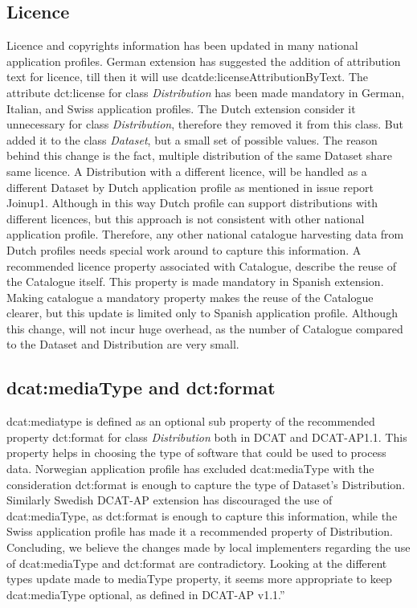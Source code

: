 \documentclass[<options>]{elsarticle}
\begin{document}
\subsection{Licence}
Licence and copyrights information has been updated in many national application profiles. German extension has suggested the addition of attribution text for licence, till then it will use dcatde:licenseAttributionByText. The attribute dct:license for class \textit{Distribution} has been made mandatory in German, Italian, and Swiss application profiles. The Dutch extension consider it unnecessary for class \textit{Distribution}, therefore they removed it from this class. But added it to the class \textit{Dataset}, but a small set of possible values. The reason behind this change is the fact, multiple distribution of the same Dataset share same licence. A Distribution with a different licence, will be handled as a different Dataset by Dutch application profile as mentioned in issue report Joinup1. Although in this way Dutch profile can support distributions with different licences, but this approach is not consistent with other national application profile. Therefore, any other national catalogue harvesting data from Dutch profiles needs special work around to capture this information. 
A recommended licence property associated with Catalogue, describe the reuse of the Catalogue itself.  This property is made mandatory in Spanish extension. Making catalogue a mandatory property makes the reuse of the Catalogue clearer, but this update is limited only to Spanish application profile. Although this change, will not incur huge overhead, as the number of Catalogue compared to the Dataset and Distribution are very small.

\subsection{dcat:mediaType and dct:format}
dcat:mediatype is defined as an optional sub property of the recommended property dct:format for class \textit{Distribution} both in DCAT and DCAT-AP1.1. This property helps in choosing the type of software that could be used to process data. Norwegian application profile has excluded dcat:mediaType with the consideration dct:format is enough to capture the type of Dataset’s Distribution. Similarly Swedish DCAT-AP extension has discouraged the use of dcat:mediaType, as dct:format is enough to capture this information, while the Swiss application profile has made it a recommended property of Distribution. Concluding, we believe the changes made by local implementers regarding the use of dcat:mediaType and dct:format are contradictory. Looking at the different types update made to mediaType property, it seems more appropriate to keep dcat:mediaType optional, as defined in DCAT-AP v1.1.”
\end{document}
